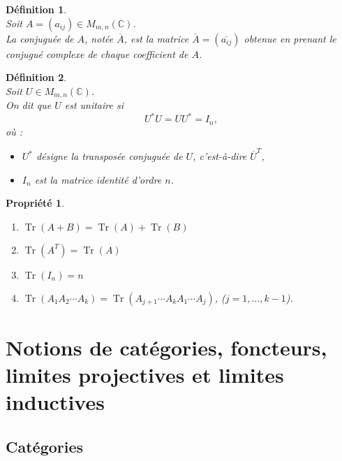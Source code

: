 \documentclass[a4paper, 14pt]{report}
\newtheorem{definition}{Définition}[section]
\newtheorem{propriety}{Propriété}[section]
\begin{document}
\begin{onehalfspace}
{\begin{definition} \cite{harville1997trace}\\
Soit \( A = (a_{ij}) \in M_{m,n}(\mathbb{C}) \).\\
La conjuguée de \( A \), notée \( \overline{A} \), est la matrice \( \overline{A} = (\overline{a_{ij}}) \) obtenue en prenant le conjugué complexe de chaque coefficient de \( A \).
\end{definition}

\begin{definition} \cite{serre1971representation} \\
Soit \( U \in M_{m,n}(\mathbb{C}) \). \\ 
On dit que \( U \) est unitaire si 
	\[
	U^* U = U U^* = I_n,
	\]
	où :
	\begin{itemize}
		\item \( U^* \) désigne la transposée conjuguée de \( U \), c'est-à-dire \( \overline{U}^T \),
		\item \( I_n \) est la matrice identité d'ordre \( n \).
	\end{itemize}
\end{definition}


\begin{propriety} \cite{harville1997trace}
	\begin{enumerate}
		\item  \(\operatorname{Tr}(A+B)=\operatorname{Tr}(A)+\operatorname{Tr}(B)\)
		\item \( \operatorname{Tr}(A^{T})=\operatorname{Tr}(A)\)
		\item \(\operatorname{Tr}(I_{n})=n\)
		
		\item \( \operatorname{Tr}(A_1 A_2 \cdots A_k) = \operatorname{Tr}(A_{j+1} \cdots A_k A_1 \cdots A_j) \),
		(\(j=1,...,k-1\)).
	\end{enumerate}
\end{propriety}







\section{Notions de catégories, foncteurs, limites projectives et limites inductives}

\subsection{Catégories}

}
\end{onehalfspace}
\end{document}

